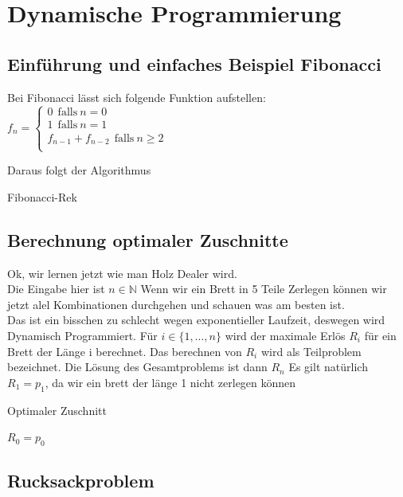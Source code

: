 \documentclass{report}
\begin{document}
\section{Dynamische Programmierung}
\subsection{Einführung und einfaches Beispiel Fibonacci}
Bei Fibonacci lässt sich folgende Funktion aufstellen: \\
$f_{n} = 
\begin{cases}
	0 \ \ \text{falls} \ n = 0 \\
	1 \ \ \text{falls} \ n = 1 \\
	f_{n-1} + f_{n-2} \ \ \text{falls} \ n \geq 2 \\
\end{cases}$

Daraus folgt der Algorithmus

\begin{algorithm}[H]
\caption{Fibonacci-Rek}

\end{algorithm}

\subsection{Berechnung optimaler Zuschnitte}
Ok, wir lernen jetzt wie man Holz Dealer wird.\\
Die Eingabe hier ist $ n \in \mathbb{N}  $ Wenn wir ein Brett in 5 Teile Zerlegen können wir jetzt alel Kombinationen durchgehen und schauen was am besten ist.\\
Das ist ein bisschen zu schlecht wegen exponentieller Laufzeit, deswegen wird Dynamisch Programmiert.
Für $ i \in \{1, \dots , n \}$ wird der maximale Erlös $R_{i}$ für ein Brett der Länge i berechnet.
Das berechnen von $R_{i}$ wird als Teilproblem bezeichnet.
Die Lösung des Gesamtproblems ist dann $R_{n}$
Es gilt natürlich $R_{1} = p_{1}$, da wir ein brett der länge 1 nicht zerlegen können\\

\begin{algorithm}[H]
\caption{Optimaler Zuschnitt}
$R_{0} = p_{0}$\\
\end{algorithm}
\subsection{Rucksackproblem}
\end{document}
